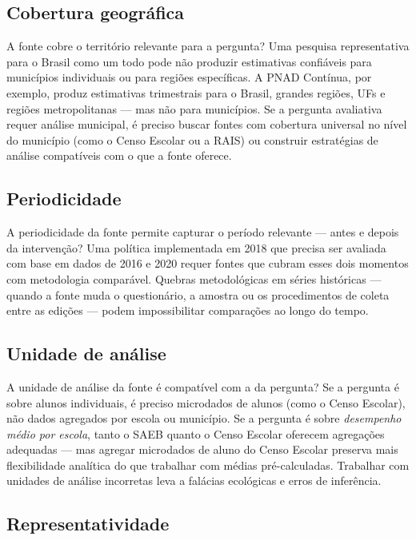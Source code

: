\subsection{Cobertura geográfica}

A fonte cobre o território relevante para a pergunta? Uma pesquisa representativa para o Brasil como um todo pode não produzir estimativas confiáveis para municípios individuais ou para regiões específicas. A PNAD Contínua, por exemplo, produz estimativas trimestrais para o Brasil, grandes regiões, UFs e regiões metropolitanas --- mas não para municípios. Se a pergunta avaliativa requer análise municipal, é preciso buscar fontes com cobertura universal no nível do município (como o Censo Escolar ou a RAIS) ou construir estratégias de análise compatíveis com o que a fonte oferece.

\subsection{Periodicidade}

A periodicidade da fonte permite capturar o período relevante --- antes e depois da intervenção? Uma política implementada em 2018 que precisa ser avaliada com base em dados de 2016 e 2020 requer fontes que cubram esses dois momentos com metodologia comparável. Quebras metodológicas em séries históricas --- quando a fonte muda o questionário, a amostra ou os procedimentos de coleta entre as edições --- podem impossibilitar comparações ao longo do tempo.

\subsection{Unidade de análise}

A unidade de análise da fonte é compatível com a da pergunta? Se a pergunta é sobre alunos individuais, é preciso microdados de alunos (como o Censo Escolar), não dados agregados por escola ou município. Se a pergunta é sobre \textit{desempenho médio por escola}, tanto o SAEB quanto o Censo Escolar oferecem agregações adequadas --- mas agregar microdados de aluno do Censo Escolar preserva mais flexibilidade analítica do que trabalhar com médias pré-calculadas. Trabalhar com unidades de análise incorretas leva a falácias ecológicas e erros de inferência.

\subsection{Representatividade}

